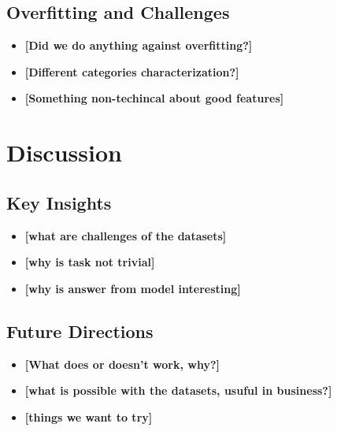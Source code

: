 \documentclass[10pt,a4paper,oneside]{article} %
\begin{document}
\subsection{Overfitting and Challenges}
\begin{itemize}
    \item \textbf{[Did we do anything against overfitting?]}
    \item \textbf{[Different categories characterization?]}
    \item \textbf{[Something non-techincal about good features]}

\end{itemize}


\section{Discussion}
\subsection{Key Insights}
\begin{itemize}
    \item \textbf{[what are challenges of the datasets]}
    \item \textbf{[why is task not trivial]}
    \item \textbf{[why is answer from model interesting]}

\end{itemize}

\subsection{Future Directions}
\begin{itemize}
    \item \textbf{[What does or doesn't work, why?]}
    \item \textbf{[what is possible with the datasets, usuful in business?]}
    \item \textbf{[things we want to try]}
\end{itemize}




\end{document}
